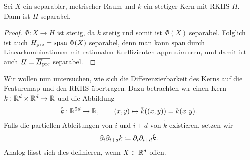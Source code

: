 \begin{lem}
\label{prop:5.3.8}
Sei $X$ ein separabler, metrischer Raum und $k$ ein stetiger Kern mit RKHS $H$.
Dann ist $H$ separabel.\fishhere
\end{lem}
\begin{proof}
$\Phi: X\to H$ ist stetig, da $k$ stetig und somit ist $\Phi(X)$ separabel.
Folglich ist auch $H_{\mathrm{pre}} = \mathrm{span}\ \Phi(X)$ separabel, denn man kann
$\mathrm{span}$ durch Linearkombinationen mit rationalen Koeffizienten
approximieren, und damit ist auch $H={\overline{H_{\mathrm{pre}}}}$ separabel.~\qedhere
\end{proof}

Wir wollen nun untersuchen, wie sich die Differenzierbarkeit des Kerns auf die
Featuremap und den RKHS übertragen. Dazu betrachten wir einen Kern $k:
\mathbb{R}^d\times \mathbb{R}^d\to \mathbb{R}$ und die Abbildung
\begin{align*}
\tilde{k}: \mathbb{R}^{2d}\to \mathbb{R},\qquad (x,y)\mapsto \tilde{k}((x,y)) = k(x,y).
\end{align*}
Falls die partiellen Ableitungen von $i$ und $i+d$ von $\tilde{k}$ existieren,
setzen wir
\begin{align*}
\partial_i \partial_{i+d} k\coloneq \partial_i \partial_{i+d}\tilde{k}.
\end{align*}
Analog lässt sich dies definieren, wenn $X\subset\mathbb{R}^d$ offen.


